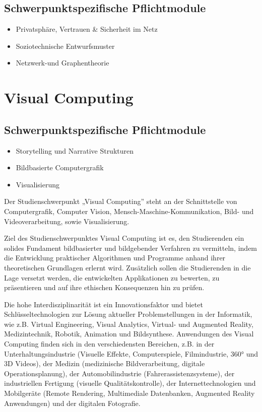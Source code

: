 \section*{Schwerpunktspezifische
Pflichtmodule}\label{schwerpunktspezifische-pflichtmodule-2}

\begin{itemize}
\tightlist
\item
  Privatsphäre, Vertrauen \& Sicherheit im Netz
\item
  Soziotechnische Entwurfsmuster
\item
  Netzwerk-und Graphentheorie
\end{itemize}

\chapter{Visual Computing}\label{visual-computing}

\section*{Schwerpunktspezifische
Pflichtmodule}\label{schwerpunktspezifische-pflichtmodule-3}

\begin{itemize}
\tightlist
\item
  Storytelling und Narrative Strukturen
\item
  Bildbasierte Computergrafik
\item
  Visualisierung
\end{itemize}

Der Studienschwerpunkt „Visual Computing'' steht an der Schnittstelle
von Computergrafik, Computer Vision, Mensch-Maschine-Kommunikation,
Bild- und Videoverarbeitung, sowie Visualisierung.

Ziel des Studienschwerpunktes Visual Computing ist es, den Studierenden
ein solides Fundament bildbasierter und bildgebender Verfahren zu
vermitteln, indem die Entwicklung praktischer Algorithmen und Programme
anhand ihrer theoretischen Grundlagen erlernt wird. Zusätzlich sollen
die Studierenden in die Lage versetzt werden, die entwickelten
Applikationen zu bewerten, zu präsentieren und auf ihre ethischen
Konsequenzen hin zu prüfen.

Die hohe Interdisziplinarität ist ein Innovationsfaktor und bietet
Schlüsseltechnologien zur Lösung aktueller Problemstellungen in der
Informatik, wie z.B. Virtual Engineering, Visual Analytics, Virtual- und
Augmented Reality, Medizintechnik, Robotik, Animation und Bildsynthese.
Anwendungen des Visual Computing finden sich in den verschiedensten
Bereichen, z.B. in der Unterhaltungsindustrie (Visuelle Effekte,
Computerspiele, Filmindustrie, 360° und 3D Videos), der Medizin
(medizinische Bildverarbeitung, digitale Operationsplanung), der
Automobilindustrie (Fahrerassistenzsysteme), der industriellen Fertigung
(visuelle Qualitätskontrolle), der Internettechnologien und Mobilgeräte
(Remote Rendering, Multimediale Datenbanken, Augmented Reality
Anwendungen) und der digitalen Fotografie.

